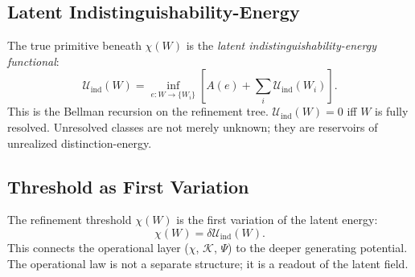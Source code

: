 \subsection{Latent Indistinguishability-Energy}
\label{sec:forcing:uind}

The true primitive beneath $\chi(W)$ is the \emph{latent
indistinguishability-energy functional}:
\[
\boxed{
\mathcal{U}_{\mathrm{ind}}(W)
=
\inf_{e : W \to \{W_i\}}
\left[
A(e) + \sum_i \mathcal{U}_{\mathrm{ind}}(W_i)
\right].
}
\]
This is the Bellman recursion on the refinement tree.
$\mathcal{U}_{\mathrm{ind}}(W) = 0$ iff $W$ is fully resolved.
Unresolved classes are not merely unknown; they are reservoirs of
unrealized distinction-energy.

\subsection{Threshold as First Variation}
\label{sec:forcing:threshold}

The refinement threshold $\chi(W)$ is the first variation of the
latent energy:
\[
\boxed{\chi(W) = \delta\mathcal{U}_{\mathrm{ind}}(W).}
\]
This connects the operational layer ($\chi$, $\mathcal{K}$, $\Psi$)
to the deeper generating potential.  The operational law is not a
separate structure; it is a readout of the latent field.
